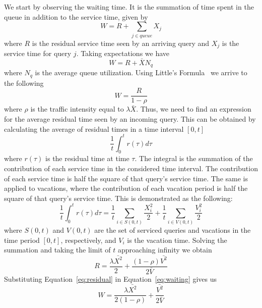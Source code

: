 We start by observing the waiting time. It is the summation of time spent in the queue in addition to the service time, given by
\begin{equation}
W = R + \sum_{j \in queue} X_j
\end{equation}
where $R$ is the residual service time seen by an arriving query and $X_j$ is the service time for query $j$. Taking expectations we have
\begin{equation}
W = R + \bar{X}N_q
\end{equation}
where $N_q$ is the average queue utilization. Using Little's Formula~\cite{Littles} we arrive to the following
\begin{equation}
\label{eq:waiting}
W = \frac{R}{1 - \rho}
\end{equation}
where $\rho$ is the traffic intensity equal to $\lambda\bar{X}$. Thus, we need to find an expression for the average residual time seen by an incoming query. This can be obtained by calculating the average of residual times in a time interval $[0, t]$
\begin{equation}
\frac{1}{t} \int_0^t r(\tau) d\tau
\end{equation}
where $r(\tau)$ is the residual time at time $\tau$. The integral is the summation of the contribution of each service time in the considered time interval. The contribution of each service time is half the square of that query's service time. The same is applied to vacations, where the contribution of each vacation period is half the square of that query's service time. This is demonstrated as the following:
\begin{equation}
\frac{1}{t} \int_0^t r(\tau) d\tau = \frac{1}{t} \sum_{i \in S(0,t)} \frac{X_i^2}{2} + \frac{1}{t} \sum_{i \in V(0,t)} \frac{V_i^2}{2}
\end{equation}
where $S(0,t)$ and $V(0,t)$ are the set of serviced queries and vacations in the time period $[0, t]$, respectively, and $V_i$ is the vacation time. Solving the summation and taking the limit of $t$ approaching infinity we obtain
\begin{equation}
\label{eq:residual}
R = \frac{\lambda\bar{X^2}}{2} + \frac{(1-\rho)\bar{V^2}}{2\bar{V}}
\end{equation}
Substituting Equation~\ref{eq:residual} in Equation~\ref{eq:waiting} gives us
\begin{equation}
\label{eq:waiting_2}
W = \frac{\lambda\bar{X^2}}{2 (1-\rho)} + \frac{\bar{V^2}}{2\bar{V}}
\end{equation}
